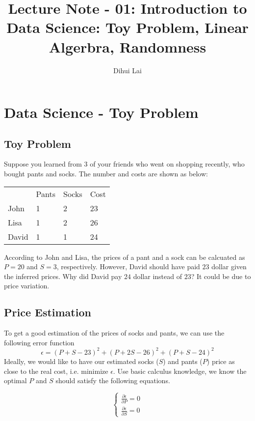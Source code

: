 \documentclass[12pt, oneside]{article}
\title{Lecture Note - 01: Introduction to Data Science: Toy Problem, Linear Algerbra, Randomness}
\author{Dihui Lai}
\begin{document}
\maketitle
\tableofcontents

\vspace{.25in}

\section{Data Science - Toy Problem}

\subsection{Toy Problem}
Suppose you learned from 3 of your friends who went on shopping recently, who bought pants and socks. The number and costs are shown as below:

\vspace{.1in}
\begin{tabular}{llll}
 &Pants  &Socks &Cost  \\
 John &1 	 &2      &23   \\
 Lisa &1      &2      &26   \\
 David &1      &1      &24 
\end{tabular}

\vspace{.1in}
According to John and Lisa, the prices of a pant and a sock can be calcuated as $P=20$ and $S=3$, respectively. However, David should have paid $23$ dollar given the inferred prices. Why did David pay $24$ dollar instead of $23$? It could be due to price variation.

\subsection{Price Estimation}
To get a good estimation of the prices of socks and pants, we can use the following error function
$$\epsilon=(P+S-23)^2+(P+2S-26)^2+(P+S-24)^2$$
Ideally, we would like to have our estimated socks ($S$) and pants ($P$) price as close to the real cost, i.e. minimize $\epsilon$.
Use basic calculus knowledge, we know the optimal $P$ and $S$ should satisfy the following equations.

\begin{equation}
\begin{cases}
\frac{\partial{\epsilon}}{\partial{P}}=0\\
\frac{\partial{\epsilon}}{\partial{S}}=0
\end{cases}
\end{equation}
\end{document}
